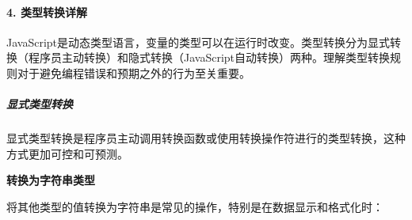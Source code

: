 \paragraph{4. 类型转换详解}\label{ux7c7bux578bux8f6cux6362ux8be6ux89e3}

JavaScript是动态类型语言，变量的类型可以在运行时改变。类型转换分为显式转换（程序员主动转换）和隐式转换（JavaScript自动转换）两种。理解类型转换规则对于避免编程错误和预期之外的行为至关重要。

\subparagraph{显式类型转换}\label{ux663eux5f0fux7c7bux578bux8f6cux6362}

显式类型转换是程序员主动调用转换函数或使用转换操作符进行的类型转换，这种方式更加可控和可预测。

\textbf{转换为字符串类型}

将其他类型的值转换为字符串是常见的操作，特别是在数据显示和格式化时：

\begin{Shaded}
\begin{Highlighting}[]
\OperatorTok{=} \OperatorTok{;}
\OperatorTok{=} \OperatorTok{;}
\OperatorTok{=}\NormalTok{ \{ }\OperatorTok{:} \NormalTok{ \}}\OperatorTok{;}

\NormalTok{(}\OperatorTok{;}        
\NormalTok{(}\OperatorTok{;}       
\NormalTok{(}\OperatorTok{;}        

\NormalTok{())}\OperatorTok{;}     
\NormalTok{())}\OperatorTok{;}    

\NormalTok{(}\NormalTok{)}\OperatorTok{;}  
\end{Highlighting}
\end{Shaded}

